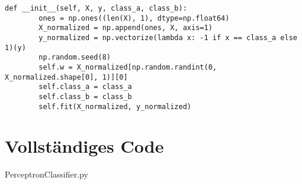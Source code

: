 \begin{lstlisting}[style=py]
    def __init__(self, X, y, class_a, class_b):
        ones = np.ones((len(X), 1), dtype=np.float64)
        X_normalized = np.append(ones, X, axis=1)
        y_normalized = np.vectorize(lambda x: -1 if x == class_a else 1)(y)
        np.random.seed(8)
        self.w = X_normalized[np.random.randint(0, X_normalized.shape[0], 1)][0]
        self.class_a = class_a
        self.class_b = class_b
        self.fit(X_normalized, y_normalized)
\end{lstlisting}


\section*{Vollständiges Code}


PerceptronClassifier.py
